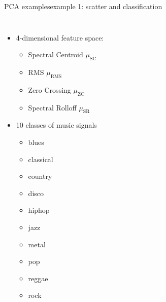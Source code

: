 
\begin{frame}{PCA examples}{example 1: scatter and classification}
		\vspace{-8mm}
    \begin{columns}
        \begin{itemize}
            \item 4-dimensional feature space: 
							\begin{itemize}
									\item	Spectral Centroid $\mu_\mathrm{SC}$
									\item RMS $\mu_\mathrm{RMS}$
									\item Zero Crossing $\mu_\mathrm{ZC}$
									\item Spectral Rolloff $\mu_\mathrm{SR}$
							\end{itemize}
						\smallskip
            \item 10 classes of music signals 
							\begin{itemize}
								\item blues
								\item classical
								\item country
								\item disco
								\item hiphop
								\item jazz
								\item metal
								\item	pop
								\item reggae
								\item rock
							\end{itemize}
        \end{itemize}
    \end{columns}
\end{frame}

